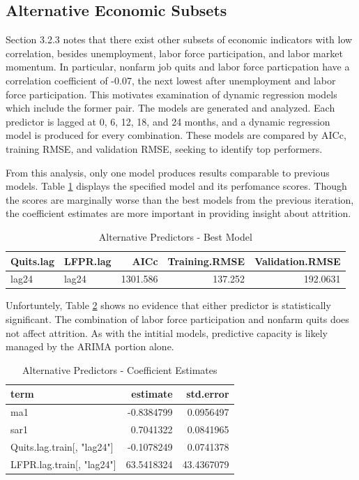 \documentclass[12pt,letterpaper,toc=flat,oneside]{report}
\theoremstyle{definition}
\theoremstyle{definition}
\theoremstyle{definition}
\theoremstyle{remark}
\begin{document}
\hypertarget{alternative-economic-subsets}{%
\subsection{Alternative Economic
Subsets}\label{alternative-economic-subsets}}

Section 3.2.3 notes that there exist other subsets of economic
indicators with low correlation, besides unemployment, labor force
participation, and labor market momentum. In particular, nonfarm job
quits and labor force particpation have a correlation coefficient of
-0.07, the next lowest after unemployment and labor force participation.
This motivates examination of dynamic regression models which include
the former pair. The models are generated and analyzed. Each predictor
is lagged at 0, 6, 12, 18, and 24 months, and a dynamic regression model
is produced for every combination. These models are compared by AICc,
training RMSE, and validation RMSE, seeking to identify top performers.

From this analysis, only one model produces results comparable to
previous models. Table \ref{tab:alt-indicators-1} displays the specified
model and its perfomance scores. Though the scores are marginally worse
than the best models from the previous iteration, the coefficient
estimates are more important in providing insight about attrition.

\begin{table}[!h]

\caption{\label{tab:alt-indicators-1}Alternative Predictors - Best Model}
\centering
\begin{tabular}[t]{llrrr}
\toprule
\bfseries{Quits.lag} & \bfseries{LFPR.lag} & \bfseries{AICc} & \bfseries{Training.RMSE} & \bfseries{Validation.RMSE}\\
\midrule
lag24 & lag24 & 1301.586 & 137.252 & 192.0631\\
\bottomrule
\end{tabular}
\end{table}

Unfortuntely, Table \ref{tab:alt-indicators-2} shows no evidence that
either predictor is statistically significant. The combination of labor
force participation and nonfarm quits does not affect attrition. As with
the intitial models, predictive capacity is likely managed by the ARIMA
portion alone.

\begin{table}[!h]

\caption{\label{tab:alt-indicators-2}Alternative Predictors - Coefficient Estimates}
\centering
\begin{tabular}[t]{lrr}
\toprule
\bfseries{term} & \bfseries{estimate} & \bfseries{std.error}\\
\midrule
ma1 & -0.8384799 & 0.0956497\\
sar1 & 0.7041322 & 0.0841965\\
Quits.lag.train[, "lag24"] & -0.1078249 & 0.0741378\\
LFPR.lag.train[, "lag24"] & 63.5418324 & 43.4367079\\
\bottomrule
\end{tabular}
\end{table}
\end{document}
